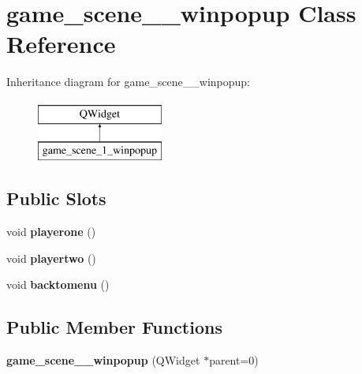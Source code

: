 \hypertarget{classgame__scene__1__winpopup}{\section{game\-\_\-scene\-\_\-\_\-winpopup Class Reference}
\label{classgame__scene__1__winpopup}
}
Inheritance diagram for game\-\_\-scene\-\_\-\_\-winpopup\-:\begin{figure}[H]
\begin{center}
\leavevmode
\includegraphics[height=2.000000cm]{classgame__scene__1__winpopup}
\end{center}
\end{figure}
\subsection*{Public Slots}
\begin{DoxyCompactItemize}
\item 
\hypertarget{classgame__scene__1__winpopup_a12540a1dd4802e5cd6cfc4ab26d45970}{void {\bfseries playerone} ()}\label{classgame__scene__1__winpopup_a12540a1dd4802e5cd6cfc4ab26d45970}

\item 
\hypertarget{classgame__scene__1__winpopup_a308df8ece43ab841f223f1b4e1b3766f}{void {\bfseries playertwo} ()}\label{classgame__scene__1__winpopup_a308df8ece43ab841f223f1b4e1b3766f}

\item 
\hypertarget{classgame__scene__1__winpopup_a3e5593c9e09d97955650915e89926af3}{void {\bfseries backtomenu} ()}\label{classgame__scene__1__winpopup_a3e5593c9e09d97955650915e89926af3}

\end{DoxyCompactItemize}
\subsection*{Public Member Functions}
\begin{DoxyCompactItemize}
\item 
\hypertarget{classgame__scene__1__winpopup_a16e390fd707bcd5b32583f4d5cac1bbe}{{\bfseries game\-\_\-scene\-\_\-\_\-winpopup} (Q\-Widget $\ast$parent=0)}\label{classgame__scene__1__winpopup_a16e390fd707bcd5b32583f4d5cac1bbe}

\end{DoxyCompactItemize}
